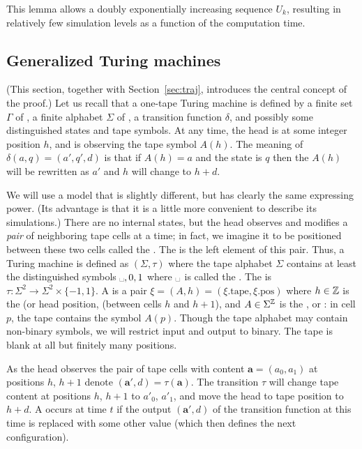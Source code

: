 \documentclass[11pt]{memoir}
\theoremstyle{definition} %
\renewcommand{\vek}[1]{\mathbf{#1}}
\def\U{U}
\newcommand{\va}{\vek{a}} %
\newcommand{\blank}{\text{\textvisiblespace}}
\newcommand{\h}{h} %
\newcommand{\pos}{\mathrm{pos}}
\newcommand{\tape}{\mathrm{tape}}
\begin{document}
This lemma allows a doubly exponentially increasing sequence \( \U_{k} \), resulting
in relatively few simulation levels as a function of the computation time.


\subsection{Generalized Turing machines}\label{sec:TM}

(This section, together with Section~\ref{sec:traj},
introduces the central concept of the proof.)
Let us recall that a one-tape Turing machine is defined by a
finite set \( \Gamma \) of ,
a finite alphabet \( \Sigma \) of , a transition function \( \delta \),
and possibly some distinguished states and tape symbols.
At any time, the head is at some integer position \( \h \), and is observing the tape
symbol \( A(\h) \).
The meaning of \( \delta(a,q)=(a',q',d) \) is that if \( A(\h)=a \) and the state is \( q \) then
the \( A(\h) \) will be rewritten as \( a' \) and \( \h \) will change to \( \h+d \).

We will use a model that is slightly different, but has clearly the same expressing power.
(Its advantage is that it is a little more convenient to describe its simulations.)
There are no internal states, but the head observes and modifies a \emph{pair} of
neighboring tape cells at a time; in fact, we imagine it to be positioned between these
two cells called the .
The  is the left element of this pair.
Thus, a Turing machine is defined as \(    (\Sigma,\tau) \) where
the tape alphabet \( \Sigma \) contains at least the distinguished
symbols \( \blank,0,1 \) where \( \blank \) is called the .
The  is
\(  \tau\colon\Sigma^{2}\to \Sigma^{2}\times\{-1,1\} \).
A  is a pair \( \xi = (A,\h) = (\xi.\tape,\xi.\pos) \)
where  \( \h\in\bbZ \) is the  (or 
head position, (between cells \( h \) and \( h+1 \)),
and \( A\in\Sigma^{\mathbb{Z}} \) is the , or :
in cell \( p \), the tape contains the symbol \( A(p) \).
Though the tape alphabet may contain
non-binary symbols, we will restrict input and output to binary.
The tape is blank at all but finitely many positions.

As the head observes the pair of tape cells
with content \( \va=(a_{0},a_{1}) \) at positions \( \h \), \( \h+1 \) denote \(  (\va',d)=\tau(\va)  \).
The transition \( \tau \) will
change tape content at positions \( \h \), \( \h+1 \) to \( a'_{0} \), \( a'_{1} \),
and move the head to tape position to \( \h+d \).
A  occurs at time \( t \) if the output \( (\va',d) \)
of the    transition function at this time is replaced with some other value
(which then defines the next configuration).
\end{document}
